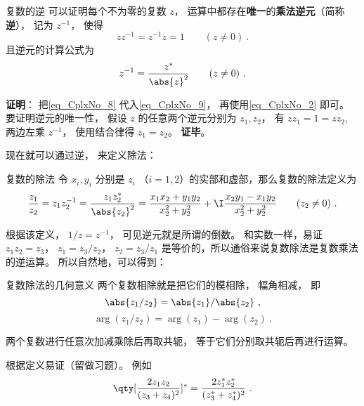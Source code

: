 \begin{definition}{复数的逆}
可以证明每个不为零的复数 $z$， 运算中都存在\textbf{唯一}的\textbf{乘法逆元}（简称\textbf{逆}）， 记为 $z^{-1}$， 使得
\begin{equation}\label{eq_CplxNo_9}
zz^{-1} = z^{-1}z = 1 \qquad (z \ne 0)~.
\end{equation}
且逆元的计算公式为
\begin{equation}\label{eq_CplxNo_8}
z^{-1} = \frac{z^*}{\abs{z}^2} \qquad (z \ne 0)~.
\end{equation}
\end{definition}
\textbf{证明}： 把\autoref{eq_CplxNo_8} 代入\autoref{eq_CplxNo_9}， 再使用\autoref{eq_CplxNo_2} 即可。 要证明逆元的唯一性， 假设 $z$ 的任意两个逆元分别为 $z_1, z_2$， 有 $zz_1 = 1 = zz_2$, 两边左乘 $z^{-1}$， 使用结合律得 $z_1 = z_2$。 \textbf{证毕}。

现在就可以通过逆， 来定义除法：
\begin{definition}{复数的除法}
令 $x_i,y_i$ 分别是 $z_i$ （$i=1,2$）的实部和虚部，那么复数的除法定义为
\begin{equation}\label{eq_CplxNo_7}
\frac{z_1}{z_2} = z_1z_2^{-1} = \frac{z_1z_2^*}{\abs{z_2}^2} = \frac{x_1 x_2 + y_1 y_2}{x_2^2 + y_2^2} + \I \frac{x_2 y_1 - x_1 y_2}{x_2^2 + y_2^2} \qquad (z_2 \ne 0)~.
\end{equation}
\end{definition}
根据该定义， $1/z = z^{-1}$， 可见逆元就是所谓的倒数。 和实数一样，易证 $z_1z_2 = z_3$， $z_1 = z_3/z_2$， $z_2 = z_3/z_1$ 是等价的，所以通俗来说复数除法是复数乘法的逆运算。 所以自然地，可以得到：

\begin{corollary}{复数除法的几何意义}
两个复数相除就是把它们的模相除， 幅角相减， 即
\begin{equation}
\abs{z_1/z_2} = \abs{z_1}/\abs{z_2}~,
\end{equation}
\begin{equation}
\arg(z_1/z_2) = \arg(z_1) - \arg(z_2)~.
\end{equation}
\end{corollary}

\begin{theorem}{}\label{the_CplxNo_1}
两个复数进行任意次加减乘除后再取共轭， 等于它们分别取共轭后再进行运算。
\end{theorem}
根据定义易证（留做习题）。 例如
\begin{equation}
\qty[\frac{2 z_1 z_2}{(z_3 + z_4)^2}]^* = \frac{2 z_1^* z_2^*}{(z_3^* + z_4^*)^2}~.
\end{equation}


